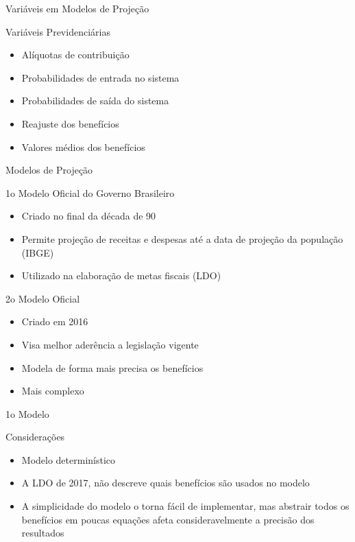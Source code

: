 \begin{frame}{Variáveis em Modelos de Projeção}
  \begin{block}{Variáveis Previdenciárias}
    \begin{itemize}
      \item Alíquotas de contribuição
      \item Probabilidades de entrada no sistema
      \item Probabilidades de saída do sistema
      \item Reajuste dos benefícios
      \item Valores médios dos benefícios
    \end{itemize}
  \end{block}
\end{frame}

\begin{frame}{Modelos de Projeção}
  \begin{block}{1o Modelo Oficial do Governo Brasileiro}
    \begin{itemize}
      \item Criado no final da década de 90
      \item Permite projeção de receitas e despesas até a data de projeção da
      população (IBGE)
      \item Utilizado na elaboração de metas fiscais (LDO)
    \end{itemize}
  \end{block}

  \begin{block}{2o Modelo Oficial}
    \begin{itemize}
      \item Criado em 2016
      \item Visa melhor aderência a legislação vigente
      \item Modela de forma mais precisa os benefícios
      \item Mais complexo
    \end{itemize}
  \end{block}
\end{frame}

\begin{frame}{1o Modelo}
  \begin{block}{Considerações}
    \begin{itemize}
      \item Modelo determinístico
      \item  A LDO de 2017, não descreve quais benefícios são usados no modelo
      \item  A simplicidade do modelo o torna fácil de implementar, mas abstrair
      todos os benefícios em poucas equações afeta consideravelmente a
      precisão dos resultados
    \end{itemize}
  \end{block}
\end{frame}

